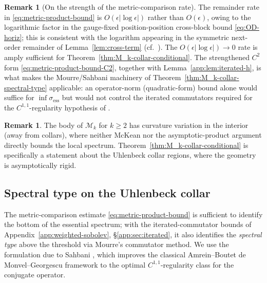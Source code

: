 \documentclass[11pt,letterpaper]{article}
\theoremstyle{definition}
\newtheorem{remark}[theorem]{Remark}
\newcommand{\cM}{\mathcal{M}}
\begin{document}
\begin{remark}[On the strength of the metric-comparison rate]\label{rmk:rate}
The remainder rate in \eqref{eq:metric-product-bound} is $O(\epsilon|\log\epsilon|)$ rather than $O(\epsilon)$, owing to the logarithmic factor in the gauge-fixed position-position cross-block bound \eqref{eq:OD-horiz}; this is consistent with the logarithm appearing in the symmetric next-order remainder of Lemma~\ref{lem:cross-term} (cf.\ \cite{lemma-ct-higher-order}). The $O(\epsilon|\log\epsilon|) \to 0$ rate is amply sufficient for Theorem~\ref{thm:M_k-collar-conditional}. The strengthened $C^2$ form \eqref{eq:metric-product-bound-C2}, together with Lemma~\ref{app:lem:iterated-h}, is what makes the Mourre/Sahbani machinery of Theorem~\ref{thm:M_k-collar-spectral-type} applicable: an operator-norm (quadratic-form) bound alone would suffice for $\inf\sigma_{\mathrm{ess}}$ but would not control the iterated commutators required for the $C^{1,1}$-regularity hypothesis of \cite{Sahbani1997}.
\end{remark}

\begin{remark}\label{rmk:collar-vs-body}
The body of $\cM_k$ for $k \ge 2$ has curvature variation in the interior (away from collars), where neither McKean nor the asymptotic-product argument directly bounds the local spectrum. Theorem~\ref{thm:M_k-collar-conditional} is specifically a statement about the Uhlenbeck collar regions, where the geometry is asymptotically rigid.
\end{remark}

\subsection{Spectral type on the Uhlenbeck collar}\label{sec:mourre}

The metric-comparison estimate \eqref{eq:metric-product-bound} is sufficient to identify the bottom of the essential spectrum; with the iterated-commutator bounds of Appendix~\ref{app:weighted-sobolev}, \S\ref{app:sec:iterated}, it also identifies the \emph{spectral type} above the threshold via Mourre's commutator method. We use the formulation due to Sahbani \cite{Sahbani1997}, which improves the classical Amrein--Boutet de Monvel--Georgescu framework \cite{ABMG1996} to the optimal $C^{1,1}$-regularity class for the conjugate operator.
\end{document}
